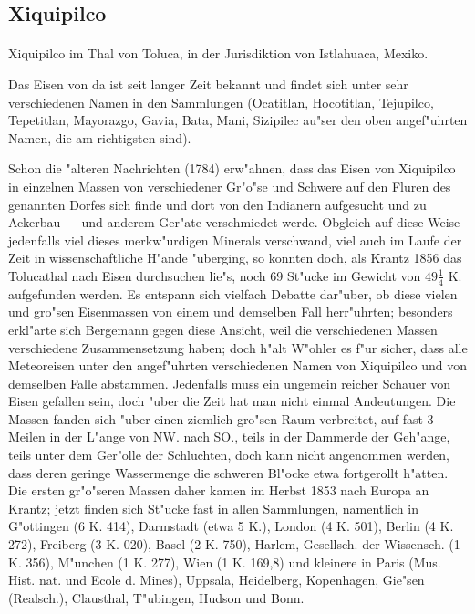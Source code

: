 \documentclass[a4paper, 11pt, oneside]{article}
\begin{document}
\subsection{Xiquipilco}
\normalsize
\paragraph{}
Xiquipilco im Thal von Toluca, in der Jurisdiktion von Istlahuaca, Mexiko.

Das Eisen von da ist seit langer Zeit bekannt und findet sich unter sehr verschiedenen Namen in den Sammlungen (Ocatitlan, Hocotitlan, Tejupilco, Tepetitlan, Mayorazgo, Gavia, Bata, Mani, Sizipilec au"ser den oben angef"uhrten Namen, die am richtigsten sind).

Schon die "alteren Nachrichten (1784) erw"ahnen, dass das Eisen von Xiquipilco in einzelnen Massen von verschiedener Gr"o"se und Schwere auf den Fluren des genannten Dorfes sich finde und dort von den Indianern aufgesucht und zu Ackerbau --- und anderem Ger"ate verschmiedet werde. Obgleich auf diese Weise jedenfalls viel dieses merkw"urdigen Minerals verschwand, viel auch im Laufe der Zeit in wissenschaftliche H"ande "uberging, so konnten doch, als Krantz 1856 das Tolucathal nach Eisen durchsuchen lie"s, noch 69 St"ucke im Gewicht von $49\frac{1}{4}$ K. aufgefunden werden. Es entspann sich vielfach Debatte dar"uber, ob diese vielen und gro"sen Eisenmassen von einem und demselben Fall herr"uhrten; besonders erkl"arte sich Bergemann gegen diese Ansicht, weil die verschiedenen Massen verschiedene Zusammensetzung haben; doch h"alt W"ohler es f"ur sicher, dass alle Meteoreisen unter den angef"uhrten verschiedenen Namen von Xiquipilco und von demselben Falle abstammen. Jedenfalls muss ein ungemein reicher Schauer von Eisen gefallen sein, doch "uber die Zeit hat man nicht einmal Andeutungen. Die Massen fanden sich "uber einen ziemlich gro"sen Raum verbreitet, auf fast 3 Meilen in der L"ange von NW. nach SO., teils in der Dammerde der Geh"ange, teils unter dem Ger"olle der Schluchten, doch kann nicht angenommen werden, dass deren geringe Wassermenge die schweren Bl"ocke etwa fortgerollt h"atten. Die ersten gr"o"seren Massen daher kamen im Herbst 1853 nach Europa an Krantz; jetzt finden sich St"ucke fast in allen Sammlungen, namentlich in G"ottingen (6 K. 414), Darmstadt (etwa 5 K.), London (4 K. 501), Berlin (4 K. 272), Freiberg (3 K. 020), Basel (2 K. 750), Harlem, Gesellsch. der Wissensch. (1 K. 356), M"unchen (1 K. 277), Wien (1 K. 169,8) und kleinere in Paris (Mus. Hist. nat. und Ecole d. Mines), Uppsala, Heidelberg, Kopenhagen, Gie"sen (Realsch.), Clausthal, T"ubingen, Hudson und Bonn.
\end{document}
